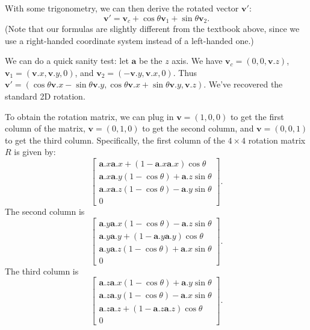 With some trigonometry, we can then derive the rotated vector $\mathbf{v}'$:
\begin{equation}
\mathbf{v}' = \mathbf{v}_c + \cos\theta \mathbf{v}_1 + \sin\theta \mathbf{v}_2.
\end{equation}
(Note that our formulas are slightly different from the textbook above, since we use a right-handed coordinate system instead of a left-handed one.)

We can do a quick sanity test: let $\mathbf{a}$ be the $z$ axis. We have $\mathbf{v}_c = \left(0, 0, \mathbf{v}.z\right)$, $\mathbf{v}_1 = \left(\mathbf{v}.x, \mathbf{v}.y, 0\right)$, and $\mathbf{v}_2 = \left(-\mathbf{v}.y, \mathbf{v}.x, 0\right)$. Thus $\mathbf{v}' = \left(\cos\theta \mathbf{v}.x - \sin\theta \mathbf{v}.y, \cos\theta \mathbf{v}.x + \sin\theta \mathbf{v}.y, \mathbf{v}.z\right)$. We've recovered the standard 2D rotation.

To obtain the rotation matrix, we can plug in $\mathbf{v}=(1, 0, 0)$ to get the first column of the matrix, $\mathbf{v}=(0, 1, 0)$ to get the second column, and $\mathbf{v}=(0, 0, 1)$ to get the third column. Specifically, the first column of the $4\times4$ rotation matrix $R$ is given by:
\begin{equation}
\begin{bmatrix}
\mathbf{a}.x \mathbf{a}.x + (1 - \mathbf{a}.x \mathbf{a}.x) \cos\theta \\
\mathbf{a}.x \mathbf{a}.y (1 - \cos\theta) + \mathbf{a}.z \sin\theta \\
\mathbf{a}.x \mathbf{a}.z (1 - \cos\theta) - \mathbf{a}.y \sin\theta \\
0 
\end{bmatrix}.
\end{equation}
The second column is
\begin{equation}
\begin{bmatrix}
\mathbf{a}.y \mathbf{a}.x (1 - \cos\theta) - \mathbf{a}.z \sin\theta \\
\mathbf{a}.y \mathbf{a}.y + (1 - \mathbf{a}.y \mathbf{a}.y) \cos\theta \\
\mathbf{a}.y \mathbf{a}.z (1 - \cos\theta) + \mathbf{a}.x \sin\theta \\
0
\end{bmatrix}.
\end{equation}
The third column is
\begin{equation}
\begin{bmatrix}
\mathbf{a}.z \mathbf{a}.x (1 - \cos\theta) + \mathbf{a}.y \sin\theta \\
\mathbf{a}.z \mathbf{a}.y (1 - \cos\theta) - \mathbf{a}.x \sin\theta \\
\mathbf{a}.z \mathbf{a}.z + (1 - \mathbf{a}.z\mathbf{a}.z) \cos\theta \\
0
\end{bmatrix}.
\end{equation}

